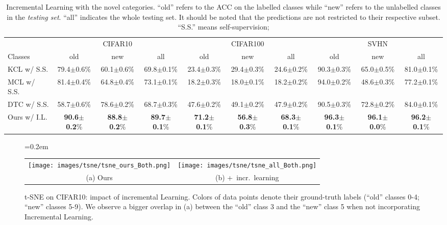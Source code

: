 \begin{table*}[htb]
\footnotesize
\centering
\caption{Incremental Learning with the novel categories. ``old'' refers to the ACC on the labelled classes while ``new'' refers to the unlabelled classes in the \emph{testing set}.
``all'' indicates the whole testing set.
It should be noted that the predictions are not restricted to their respective subset. ``S.S.'' means self-supervision; }\label{tab:increment}
\begin{tabular}{lccccccccc}
\toprule
& \multicolumn{3}{c}{CIFAR10} & \multicolumn{3}{c}{CIFAR100} & \multicolumn{3}{c}{SVHN}\\
\cmidrule(rl){2-4}
\cmidrule(rl){5-7}
\cmidrule(rl){8-10}
Classes       & old      & new     & all        & old       & new       & all       & old       & new       & all \\\midrule
KCL w/ S.S.
  & 79.4$\pm$0.6\%   & 60.1$\pm$0.6\%  & 69.8$\pm$0.1\%     & 23.4$\pm$0.3\%    & 29.4$\pm$0.3\%    & 24.6$\pm$0.2\%    & 90.3$\pm$0.3\%    & 65.0$\pm$0.5\%    & 81.0$\pm$0.1\% \\
MCL w/ S.S.
  & 81.4$\pm$0.4\%   & 64.8$\pm$0.4\%  & 73.1$\pm$0.1\%     & 18.2$\pm$0.3\%    & 18.0$\pm$0.1\%    & 18.2$\pm$0.2\%    & 94.0$\pm$0.2\%    & 48.6$\pm$0.3\%    & 77.2$\pm$0.1\% \\
DTC w/ S.S.
  & 58.7$\pm$0.6\%   & 78.6$\pm$0.2\%  & 68.7$\pm$0.3\%     & 47.6$\pm$0.2\%    & 49.1$\pm$0.2\%    & 47.9$\pm$0.2\%    & 90.5$\pm$0.3\%    & 72.8$\pm$0.2\%    & 84.0$\pm$0.1\% \\
\midrule
Ours w/ I.L.
 & \textbf{90.6$\pm$0.2}\% & \textbf{88.8$\pm$0.2}\%  & \textbf{89.7$\pm$0.1}\% & \textbf{71.2$\pm$0.1}\% & \textbf{56.8$\pm$0.3}\% & \textbf{68.3$\pm$0.1}\% & \textbf{96.3$\pm$0.1}\% & \textbf{96.1$\pm$0.0}\% & \textbf{96.2$\pm$0.1}\% \\
\bottomrule
\end{tabular}
\end{table*}


\begin{figure}[t]
\centering
\tabcolsep=0.2em
\renewcommand{\arraystretch}{0.25}
\begin{tabular}[b]{cc}
{\texttt{[image: images/tsne/tsne\_ours\_Both.png]}} &
{\texttt{[image: images/tsne/tsne\_all\_Both.png]}} \\
(a) Ours & (b) +~incr.~learning
\end{tabular}\hfill
\caption{t-SNE on CIFAR10: impact of incremental Learning.
Colors of data points denote their ground-truth labels (``old'' classes 0-4; ``new'' classes 5-9). We observe a bigger overlap in (a) between the ``old'' class 3 and the ``new'' class 5 when not incorporating Incremental Learning.}\label{fig:tsne_both}
\end{figure}

